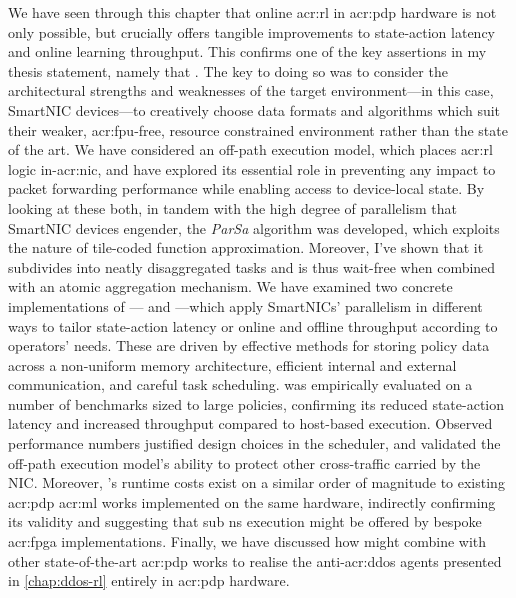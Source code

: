We have seen through this chapter that online \gls{acr:rl} in \gls{acr:pdp} hardware is not only possible, but crucially offers tangible improvements to state-action latency and online learning throughput.
This confirms one of the key assertions in my thesis statement, namely that .
The key to doing so was to consider the architectural strengths and weaknesses of the target environment---in this case, SmartNIC devices---to creatively choose data formats and algorithms which suit their weaker, \gls{acr:fpu}-free, resource constrained environment rather than the state of the art.
We have considered an off-path execution model, which places \gls{acr:rl} logic in-\gls{acr:nic}, and have explored its essential role in preventing any impact to packet forwarding performance while enabling access to device-local state.
By looking at these both, in tandem with the high degree of parallelism that SmartNIC devices engender, the \emph{ParSa} algorithm was developed, which exploits the nature of tile-coded function approximation.
Moreover, I've shown that it subdivides into neatly disaggregated tasks and is thus wait-free when combined with an atomic aggregation mechanism.
We have examined two concrete implementations of \approachshort{}---\indfw{} and \coopfw---which apply SmartNICs' parallelism in different ways to tailor state-action latency or online and offline throughput according to operators' needs.
These are driven by effective methods for storing policy data across a non-uniform memory architecture, efficient internal and external communication, and careful task scheduling.
\approachshort{} was empirically evaluated on a number of benchmarks sized to large policies, confirming its reduced state-action latency and increased throughput compared to host-based execution.
Observed performance numbers justified design choices in the scheduler, and validated the off-path execution model's ability to protect other cross-traffic carried by the NIC.
Moreover, \approachshort{}'s runtime costs exist on a similar order of magnitude to existing \gls{acr:pdp} \gls{acr:ml} works implemented on the same hardware, indirectly confirming its validity and suggesting that sub \unit{\nano\second} execution might be offered by bespoke \gls{acr:fpga} implementations.
Finally, we have discussed how \approachshort{} might combine with other state-of-the-art \gls{acr:pdp} works to realise the anti-\gls{acr:ddos} agents presented in \cref{chap:ddos-rl} entirely in \gls{acr:pdp} hardware.

